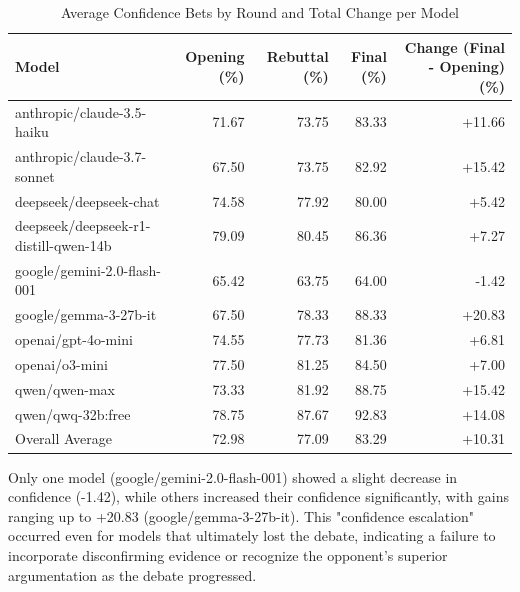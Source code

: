 \documentclass{article}
\begin{document}
\begin{table}[h]
  \caption{Average Confidence Bets by Round and Total Change per Model}
  \label{tab:confidence_escalation}
  \centering
  \begin{tabular}{lrrrr}
    \toprule
    Model                              & Opening (\%) & Rebuttal (\%) & Final (\%) & Change (Final - Opening) (\%) \\
    \midrule
    anthropic/claude-3.5-haiku         & 71.67   & 73.75    & 83.33   & +11.66 \\
    anthropic/claude-3.7-sonnet        & 67.50   & 73.75    & 82.92   & +15.42 \\
    deepseek/deepseek-chat             & 74.58   & 77.92    & 80.00   & +5.42  \\
    deepseek/deepseek-r1-distill-qwen-14b & 79.09   & 80.45    & 86.36   & +7.27  \\
    google/gemini-2.0-flash-001        & 65.42   & 63.75    & 64.00   & -1.42  \\
    google/gemma-3-27b-it              & 67.50   & 78.33    & 88.33   & +20.83 \\
    openai/gpt-4o-mini                 & 74.55   & 77.73    & 81.36   & +6.81  \\
    openai/o3-mini                     & 77.50   & 81.25    & 84.50   & +7.00  \\
    qwen/qwen-max                      & 73.33   & 81.92    & 88.75   & +15.42 \\
    qwen/qwq-32b:free                  & 78.75   & 87.67    & 92.83   & +14.08 \\
    \midrule
    Overall Average                    & 72.98   & 77.09    & 83.29   & +10.31 \\ %
    \bottomrule
  \end{tabular}
\end{table}

Only one model (google/gemini-2.0-flash-001) showed a slight decrease in confidence (-1.42), while others increased their confidence significantly, with gains ranging up to +20.83 (google/gemma-3-27b-it). This "confidence escalation" occurred even for models that ultimately lost the debate, indicating a failure to incorporate disconfirming evidence or recognize the opponent's superior argumentation as the debate progressed.
\end{document}
